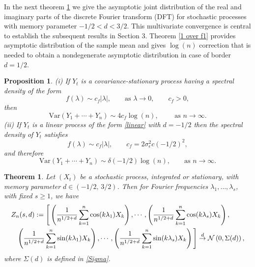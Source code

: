 \documentclass[10pt,a4paper]{amsart}
\numberwithin{equation}{section}
\newtheorem{thm}{Theorem}[section]
\newtheorem{prop}{Proposition}[section]
\begin{document}
In the next theorem \ref{finite dim}  we give the  asymptotic
joint distribution of the real and imaginary parts of the discrete Fourier transform (DFT) for stochastic processes  with memory parameter $-1/2<d<3/2$. This multivariate convergence is central to establish the subsequent results in Section 3. Theorem \ref{1 over f1}  provides asymptotic distribution of the sample mean and gives $\log(n)$ correction that is needed to obtain a nondegenerate asymptotic distribution in case of border $d=1/2$.
\begin{prop}
     \label{unit root1} (i) If $Y_t$ is a covariance-stationary process having a spectral density of the form
$$
f(\lambda)\sim c_f\vert\lambda\vert,\qquad\textrm{as }\lambda\to0,\qquad c_f>0,
$$
then
$$
\textrm{Var}(Y_1+\cdots+Y_n)\sim 4c_f\log(n),\qquad\textrm{ as }n\to\infty.
$$
(ii) If $Y_t$ is a linear process of the form \eqref{linear} with $d=-1/2$
   then the  spectral density of $Y_t$ satisfies
$$
f(\lambda)\sim c_f\vert\lambda\vert,\qquad c_f=2\sigma^2_\epsilon c(-1/2)^2,
$$
and therefore
\begin{equation}\label{var sum 1/2}
    \textrm{Var}(Y_1+\cdots+Y_n)\sim\delta(-1/2)\log(n),\qquad\textrm{as }n\to\infty.
\end{equation}
\end{prop}

\begin{thm}
\label{finite dim} 
Let $(X_t)$ be a stochastic process, integrated or stationary, with memory parameter $d \in (-1/2,\,3/2)$. Then for  Fourier frequencies  $\lambda_1,\ldots,\lambda_s$, with fixed $s\ge1$, we have 
\begin{eqnarray*}\lefteqn{
Z_n(s,d):=\Bigg[\left(\frac{1}{n^{1/2+d}}\sum_{k=1}^n\cos(k\lambda_{1})X_k\right),
\cdots,\left(\frac{1}{n^{1/2+d}}\sum_{k=1}^n\cos(k\lambda_{s})X_k\right),}\nonumber\\
&& \left(\frac{1}{n^{1/2+d}}\sum_{k=1}^n\sin(k\lambda_1)X_k\right),\cdots,\left(\frac{1}{n^{1/2+d}}\sum_{k=1}^n\sin(k\lambda_{s})X_k\right)\Bigg]\overset{d}{\rightarrow}\mathcal{N}\left(0,\Sigma(d)\right), 
\end{eqnarray*}
where $\Sigma(d)$ is defined in \eqref{Sigma}.
\end{thm}
\end{document}
